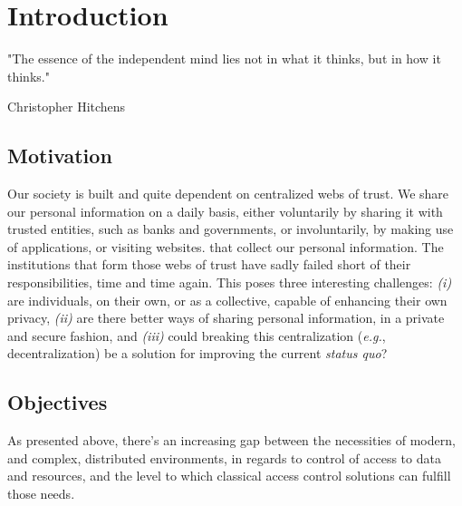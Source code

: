 \chapter{Introduction}
\label{chap:intro}

\epigraph{"The essence of the independent mind lies not in what it thinks, but in how it thinks."}{Christopher Hitchens \cite{hitchens_letters_2009}}

\section{Motivation}

Our society is built and quite dependent on centralized webs of trust. We share our personal information on a daily basis, either voluntarily by sharing it with trusted entities, such as banks and governments, or involuntarily, by making use of applications, or visiting websites. that collect our personal information. The institutions that form those webs of trust have sadly failed short of their responsibilities, time and time again. This poses three interesting challenges: \emph{(i)} are individuals, on their own, or as a collective, capable of enhancing their own privacy, \emph{(ii)} are there better ways of sharing personal information, in a private and secure fashion, and \emph{(iii)} could breaking this centralization (\textit{e.g.}, decentralization) be a solution for improving the current \textit{status quo}?

\section{Objectives}

As presented above, there's an increasing gap between the necessities of modern, and complex, distributed environments, in regards to control of access to data and resources, and the level to which classical access control solutions can fulfill those needs.

